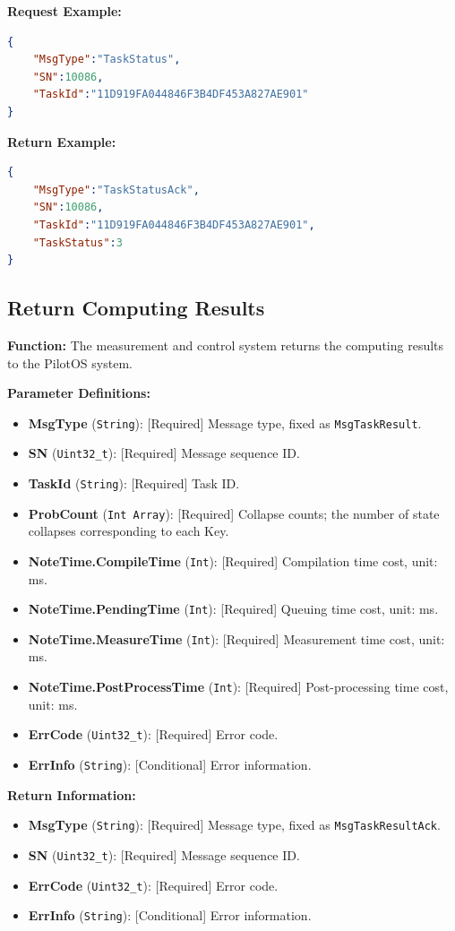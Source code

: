 \documentclass[12pt, a4paper]{article}
\begin{document}
\noindent \textbf{Request Example:}
\begin{lstlisting}[language=json]
{
    "MsgType":"TaskStatus",
    "SN":10086,
    "TaskId":"11D919FA044846F3B4DF453A827AE901"
}
\end{lstlisting}

\noindent \textbf{Return Example:}
\begin{lstlisting}[language=json]
{
    "MsgType":"TaskStatusAck",
    "SN":10086,
    "TaskId":"11D919FA044846F3B4DF453A827AE901",
    "TaskStatus":3
}
\end{lstlisting}

\subsection{Return Computing Results}

\textbf{Function:} The measurement and control system returns the computing results to the PilotOS system.

\textbf{Parameter Definitions:}
\begin{itemize}
    \item \textbf{MsgType} (\texttt{String}): [Required] Message type, fixed as \texttt{MsgTaskResult}.
    \item \textbf{SN} (\texttt{Uint32\_t}): [Required] Message sequence ID.
    \item \textbf{TaskId} (\texttt{String}): [Required] Task ID.
    \item \textbf{ProbCount} (\texttt{Int Array}): [Required] Collapse counts; the number of state collapses corresponding to each Key.
    \item \textbf{NoteTime.CompileTime} (\texttt{Int}): [Required] Compilation time cost, unit: ms.
    \item \textbf{NoteTime.PendingTime} (\texttt{Int}): [Required] Queuing time cost, unit: ms.
    \item \textbf{NoteTime.MeasureTime} (\texttt{Int}): [Required] Measurement time cost, unit: ms.
    \item \textbf{NoteTime.PostProcessTime} (\texttt{Int}): [Required] Post-processing time cost, unit: ms.
    \item \textbf{ErrCode} (\texttt{Uint32\_t}): [Required] Error code.
    \item \textbf{ErrInfo} (\texttt{String}): [Conditional] Error information.
\end{itemize}

\textbf{Return Information:}
\begin{itemize}
    \item \textbf{MsgType} (\texttt{String}): [Required] Message type, fixed as \texttt{MsgTaskResultAck}.
    \item \textbf{SN} (\texttt{Uint32\_t}): [Required] Message sequence ID.
    \item \textbf{ErrCode} (\texttt{Uint32\_t}): [Required] Error code.
    \item \textbf{ErrInfo} (\texttt{String}): [Conditional] Error information.
\end{itemize}
\end{document}
